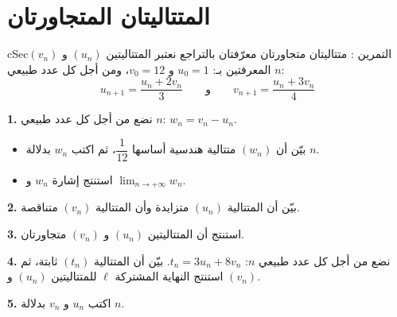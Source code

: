 \documentclass[12pt,a4paper]{article}
\newenvironment{BOX}[2]{\begin{otherlanguage}{english}\begin{arbox}{#1}{#2}}{\end{arbox}\end{otherlanguage}}
\newcounter{exo}
\newenvironment{tamrin}[1]{\stepcounter{exo}\begin{BOX}{cSec}{التمرين \theexo: #1}}{\end{BOX}}
\newcommand{\limn}{\displaystyle\lim_{n\to+\infty}}
\newenvironment{sq}{\begin{itemize}[leftmargin=2.4em,itemsep=3pt]}{\end{itemize}}
\newcommand{\qa}{\item[(أ)]}\newcommand{\qb}{\item[(ب)]}\newcommand{\qc}{\item[(جـ)]}\newcommand{\qd}{\item[(د)]}\newcommand{\qe}{\item[(هـ)]}
\newcommand{\QQ}[1]{\par\smallskip\textbf{#1.} }
\begin{document}
\section{المتتاليتان المتجاورتان}

\begin{tamrin}{متتاليتان متجاورتان معرّفتان بالتراجع}
نعتبر المتتاليتين $(u_n)$ و $(v_n)$ المعرفتين بـ: $u_0=1$ و $v_0=12$، ومن أجل كل عدد طبيعي $n$:
\[u_{n+1}=\frac{u_n+2v_n}{3}\qquad\text{و}\qquad v_{n+1}=\frac{u_n+3v_n}{4}\]
\QQ{1} نضع من أجل كل عدد طبيعي $n$: $w_n=v_n-u_n$.
\begin{sq}
\qa بيّن أن $(w_n)$ متتالية هندسية أساسها $\dfrac1{12}$، ثم اكتب $w_n$ بدلالة $n$.
\qb استنتج إشارة $w_n$ و $\limn w_n$.
\end{sq}
\QQ{2} بيّن أن المتتالية $(u_n)$ متزايدة وأن المتتالية $(v_n)$ متناقصة.
\QQ{3} استنتج أن المتتاليتين $(u_n)$ و $(v_n)$ متجاورتان.
\QQ{4} نضع من أجل كل عدد طبيعي $n$: $t_n=3u_n+8v_n$. بيّن أن المتتالية $(t_n)$ ثابتة، ثم استنتج النهاية المشتركة $\ell$ للمتتاليتين $(u_n)$ و $(v_n)$.
\QQ{5} اكتب $u_n$ و $v_n$ بدلالة $n$.
\end{tamrin}
\end{document}
